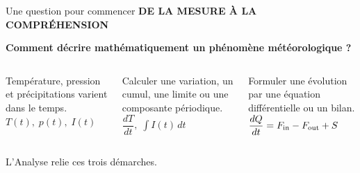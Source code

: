 \documentclass[aspectratio=169,10pt]{beamer}
\newcommand{\meta}[1]{{\small\bfseries\color{turquoise} #1}\par\vspace{0.07cm}}
\begin{document}
\begin{frame}{Une question pour commencer}
\meta{DE LA MESURE À LA COMPRÉHENSION}
\begin{center}
{\Large\bfseries Comment décrire mathématiquement un phénomène météorologique ?}
\end{center}
\vspace{0.28cm}
\begin{columns}[T,onlytextwidth]
\begin{tcolorbox}[colback=pale,colframe=pale,height=3.02cm]
\par\vspace{0.33cm}
\small Température, pression et précipitations varient dans le temps.
\vfill
$T(t),\; p(t),\; I(t)$
\end{tcolorbox}
\begin{tcolorbox}[colback=palevert,colframe=palevert,height=3.02cm]
\par\vspace{0.33cm}
\small Calculer une variation, un cumul, une limite ou une composante périodique.
\vfill
$\dfrac{dT}{dt},\;\int I(t)\,dt$
\end{tcolorbox}
\begin{tcolorbox}[colback=paleorange,colframe=paleorange,height=3.02cm]
\par\vspace{0.33cm}
\small Formuler une évolution par une équation différentielle ou un bilan.
\vfill
$\dfrac{dQ}{dt}=F_{\rm in}-F_{\rm out}+S$
\end{tcolorbox}
\end{columns}
\vspace{0.16cm}
\begin{center}{\small\color{gris}L'Analyse relie ces trois démarches.}\end{center}
\end{frame}
\end{document}
